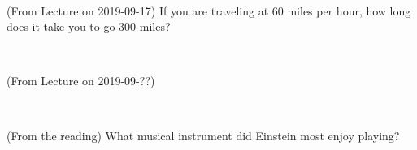\documentclass[12pt, letterpaper]{article}
\begin{document}
\vfill ~

\begin{problem} (From Lecture on 2019-09-17)
If you are traveling at 60 miles per hour, how long does
it take you to go 300 miles?
\end{problem}


\vfill ~

\begin{problem} (From Lecture on 2019-09-??)
\end{problem}


\vfill ~

\begin{problem} (From the reading)
What musical instrument did Einstein most enjoy playing?
\end{problem}


\vfill ~


\cleardoublepage
\end{document}
